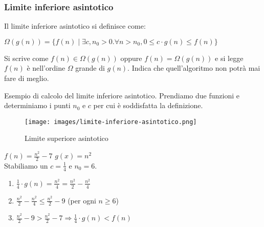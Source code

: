 \subsubsection{Limite inferiore asintotico}
\begin{definition}
Il limite inferiore asintotico si definisce come:
\begin{center}
    $\Omega(g(n)) = \{f(n) \mid \exists c, n_0 > 0 . \forall n > n_0, 0 \leq c \cdot g(n) \leq f(n) \}$
\end{center}
\end{definition}
\hspace{-15pt}Si scrive come $f(n) \in \Omega(g(n))$ oppure $f(n) = \Omega(g(n))$ e si legge $f(n)$ è nell'ordine $\Omega$ grande di $g(n)$. Indica che quell'algoritmo non potrà mai fare di meglio.
\begin{example}
Esempio di calcolo del limite inferiore asintotico. Prendiamo due funzioni e determiniamo i punti $n_0$ e $c$ per cui è soddisfatta la definizione.
\end{example}
\begin{wrapfigure}[6]{r}{8cm}
    \vspace{-15pt}
    \centering
    \texttt{[image: images/limite-inferiore-asintotico.png]}
    \vspace{-5pt}
    \caption{Limite superiore asintotico}
\end{wrapfigure}

$f(n) = \frac{n^2}{2}-7$ \: \: \: $g(x)=n^2$\\
Stabiliamo un $c = \frac{1}{4}$ e $n_0 = 6$.
\begin{enumerate}
    \item $\frac{1}{4} \cdot g(n) = \frac{n^2}{4} = \frac{n^2}{2} - \frac{n^2}{4}$
    \item $\frac{n^2}{2} - \frac{n^2}{4} \leq \frac{n^2}{2} - 9 $ (per ogni $n \geq 6$)
    \item $\frac{n^2}{2} - 9 > \frac{n^2}{2}-7 \Longrightarrow \frac{1}{4} \cdot g(n) < f(n)$
\end{enumerate}

